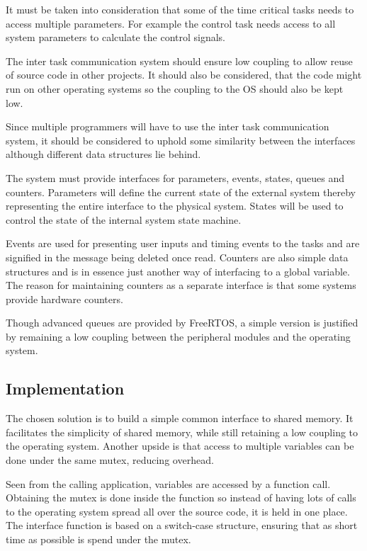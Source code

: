  It must be taken into consideration that some of the time critical tasks needs
 to access multiple parameters. For example the control task needs access to all
 system parameters to calculate the control signals.
 
 The inter task communication system should ensure low coupling to allow reuse
 of source code in other projects. It should also be considered, that the code
 might run on other operating systems so the coupling to the OS should also be kept
 low.
 
 Since multiple programmers will have to use the inter task communication
 system, it should be considered to uphold some similarity between the
 interfaces although different data structures lie behind.
 
 The system must provide interfaces for parameters, events, states, queues
and counters. Parameters will define the current state of the external system
thereby representing the entire interface to the physical system. States will be
used to control the state of the internal system state machine.

Events are used for presenting user inputs and timing events to the tasks and
are signified in the message being deleted once read. Counters are also simple
data structures and is in essence just another way of interfacing to a global
variable. The reason for maintaining counters as a separate interface is that
some systems provide hardware counters.

Though advanced queues are provided by FreeRTOS, a simple version is justified by
remaining a low coupling between the peripheral modules and the operating
system.

\subsection{Implementation}
The chosen solution is to build a simple common interface to shared memory. It
facilitates the simplicity of shared memory, while still retaining a low
coupling to the operating system. Another upside is that access to multiple
variables can be done under the same mutex, reducing overhead.

Seen from the calling application, variables are accessed by a function call.
Obtaining the mutex is done inside the function so instead of having lots of
calls to the operating system spread all over the source code, it is held in
one place. The interface function is based on a switch-case structure, ensuring
that as short time as possible is spend under the mutex.


